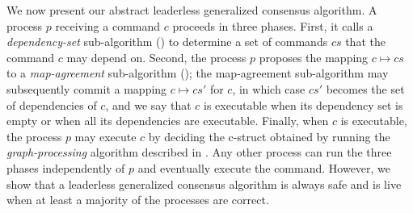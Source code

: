 \begin{comment}

A c-struct set is a set containing the element $\bot$ and with an append operator $\bullet$ such that $\sigma \bullet c$ is a c-struct, for any c-struct $\sigma$ and command $c$. 
We also write the $\sigma\bullet\aseq{c_1,\cdots,c_n}$ for the c-struct $\sigma\bullet c_1\bullet\cdots\bullet c_n$.
C-structs are partially ordered by the relation $\sqsubseteq$ defined such that $\sigma_1\sqsubseteq\sigma_2$ iff there exists a sequence of commands $cs$ such that $\sigma_2=\sigma_1\bullet cs$. Two c-structs are compatible when they have a common upper bound; when this is the case, two c-structs $\sigma_1$ and $\sigma_2$ have a least upper bound, noted $\bigsqcup\left( \sigma_1,\sigma_2 \right)$.
We say that two commands \textit{commute} when $\sigma\bullet c_1\bullet c_2 =  \sigma\bullet c_2\bullet c_1 $, for every c-struct $\sigma$. Intuitively, a c-struct represents a set of sequences that are all equivalent up to the ordering of commutative commands (see~\cite{Lamport05GeneralizeConsensus} for a complete discussion on c-struct). 
In the rest of the paper the symbol $c$, possibly sub-scripted, ranges over commands, and the symbol $\mathcal{D}$, possibly sub-scripted, ranges over sets of commands.

We can now state the generalized-consensus properties: non-triviality requires that any decided c-struct be of the form $\bot\bullet cs$, where $cs$ is a sequence of proposed commands; consistency requires than any two decided c-structs $\sigma_1$ and $\sigma_2$ be compatible; stability requires that when a process $p$ decides a c-struct $\sigma_1$ and time $t_1$ and $\sigma_2$ at time $t_2$, then $t_1 \leq t_2$ implies that $\sigma_1\sqsubseteq \sigma_2$; finally, liveness requires that
if a command keeps beeing proposed, then a c-struct $\sigma$ containing the command is eventually decided.

\end{comment}

We now present our abstract leaderless generalized consensus algorithm.
A process $p$ receiving a command $c$ proceeds in three phases. First, it calls a \textit{dependency-set} sub-algorithm () to determine a set of commands $cs$ that the command $c$ may depend on. Second, the process $p$ proposes the mapping  $c\mapsto cs$ to a \textit{map-agreement} sub-algorithm (); the map-agreement sub-algorithm may subsequently commit a mapping $c\mapsto cs'$ for $c$, in which case $cs'$ becomes the set of dependencies of $c$, and we say that $c$ is executable when its dependency set is empty or when all its dependencies are executable. 
Finally, when $c$ is executable, the process $p$ may execute $c$ by deciding the c-struct obtained by running the \emph{graph-processing} algorithm described in .
Any other process can run the three phases independently of $p$ and eventually execute the command.
However, we show that a leaderless  generalized consensus algorithm is always safe and is live when at least a majority of the processes are correct.

